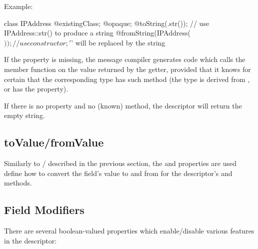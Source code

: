 Example:

\begin{msg}
class IPAddress
{
    @existingClass;
    @opaque;
    @toString(.str());  // use IPAddress::str() to produce a string
    @fromString(IPAddress($));  // use constructor; '$' will be replaced by the string
}
\end{msg}

If the  property is missing, the message compiler generates
code which calls the  member function on the value returned by the
getter, provided that it knows for certain that the corresponding type has such
method (the type is derived from , or has the  property).

If there is no  property and no (known)  method,
the descriptor will return the empty string.


\subsection{toValue/fromValue}
\label{sec:msg-defs:descriptor-tovalue}

Similarly to / described in the previous
section, the  and  properties are used define
how to convert the field's value to and from  for the
descriptor's  and  methods.


\subsection{Field Modifiers}
\label{sec:msg-defs:descriptor-fieldmodifiers}

There are several boolean-valued properties which enable/disable various
features in the descriptor:

